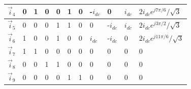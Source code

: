\begin{table}[]
\begin{tabular}{|l|l|l|l|l|l|l|l|l|l|l|}
    $\vec{i}_4$                                                                            & 0          & 1          & 0          & 0          & 1          & 0          & -$i_{dc}$                  & 0                     & $i_{dc}$                  & $2i_{dc}e^{j7\pi/6}/\sqrt{3}$                                                                                          \\ \hline
    $\vec{i}_5$                                                                           & 0          & 0          & 0          & 1          & 1          & 0          & 0                     & -$i_{dc}$                  & $i_{dc}$                  & $2i_{dc}e^{j3\pi/2}/\sqrt{3}$                                                                                           \\ \hline
    $\vec{i}_6$                                                                            & 1          & 0          & 0          & 1          & 0          & 0          & $i_{dc}$                   & -$i_{dc}$                  & 0                    & $2i_{dc}e^{j11\pi/6}/\sqrt{3}$                                                                                           \\ \hline
    $\vec{i}_7$                                                                            & 1          & 1          & 0          & 0          & 0          & 0          & 0                     & 0                     & 0                    & 0                                                                                             \\ \hline
    $\vec{i}_8$                                                                            & 0          & 0          & 1          & 1          & 0          & 0          & 0                     & 0                     & 0                    & 0                                                                                             \\ \hline
    $\vec{i}_9$                                                                            & 0          & 0          & 0          & 0          & 1          & 1          & 0                     & 0                     & 0                    & 0                                                                                             \\ \hline
    \end{tabular}
        \label{EMPC:tbl:fundamental_vect}

\end{table}

